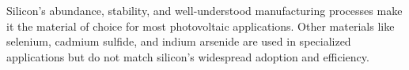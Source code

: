 Silicon's abundance, stability, and well-understood manufacturing processes make it the material of choice for most photovoltaic applications. Other materials like selenium, cadmium sulfide, and indium arsenide are used in specialized applications but do not match silicon's widespread adoption and efficiency.

